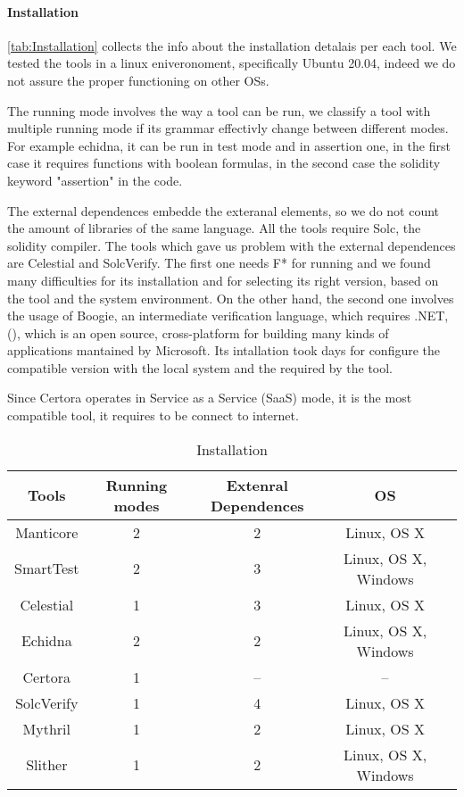 \paragraph{Installation} \autoref{tab:Installation} collects the info about the installation detalais per each tool. 
We tested the tools in a linux eniveronoment, specifically Ubuntu 20.04, indeed we do not assure the proper functioning on other OSs.

The running mode involves the way a tool can be run, we classify a tool with multiple running mode if its grammar effectivly change between different modes. For example echidna, it can be run in 
test mode and in assertion one, in the first case it requires functions with boolean formulas, in the second case the solidity keyword "assertion" in the code.

The external dependences embedde the exteranal elements, so we do not count the amount of libraries of the same language. All the tools require Solc, the solidity compiler. 
The tools which gave us problem with the external dependences are Celestial and SolcVerify. The first one needs F* for running and we found many difficulties for its installation and for selecting its right version, 
based on the tool and the system environment. On the other hand, the second one involves the usage of Boogie, an intermediate verification language, which requires .NET, (\cite{NET}), 
which is an open source, cross-platform for building many kinds of applications mantained by Microsoft. 
Its intallation took days for configure the compatible version with the local system and the required by the tool.

Since Certora operates in Service as a Service (SaaS) mode, it is the most compatible tool, it requires to be connect to internet.

\begin{center}
    \begin{table*}
        \caption{Installation}
        \label{tab:Installation}
        \begin{tabular}{ccccc}
        \toprule
            Tools  &  Running modes & Extenral Dependences & OS \\
            \midrule
            Manticore & 2 & 2 & Linux, OS X\\
            SmartTest & 2 & 3 & Linux, OS X, Windows \\
            Celestial & 1 & 3 & Linux, OS X\\
            Echidna & 2 & 2 & Linux, OS X, Windows\\
            Certora & 1 & -- & -- \\ 
            SolcVerify & 1 & 4  &  Linux, OS X \\
            Mythril  & 1 & 2  &  Linux, OS X \\ 
            Slither & 1 & 2 & Linux, OS X, Windows \\   
        \bottomrule
        \end{tabular}
    \end{table*}
    \end{center}

